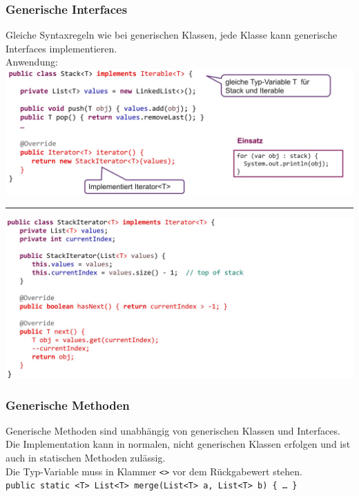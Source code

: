 \subsubsection{Generische Interfaces}\label{StackIterator}
Gleiche Syntaxregeln wie bei generischen Klassen, jede Klasse kann generische Interfaces implementieren.\\
Anwendung:\\
\includegraphics[width=\linewidth]{pictures/generic-interface1.jpg}
\hrule
\includegraphics[width=\linewidth]{pictures/generic-interface2.jpg}

\subsubsection{Generische Methoden}
Generische Methoden sind unabhängig von generischen Klassen und Interfaces. Die Implementation kann in normalen, 
nicht generischen Klassen erfolgen und ist auch in statischen Methoden zulässig.\\
Die Typ-Variable muss in Klammer \verb|<>| vor dem Rückgabewert stehen. \\
\verb|public static <T> List<T> merge(List<T> a, List<T> b) { … }|

